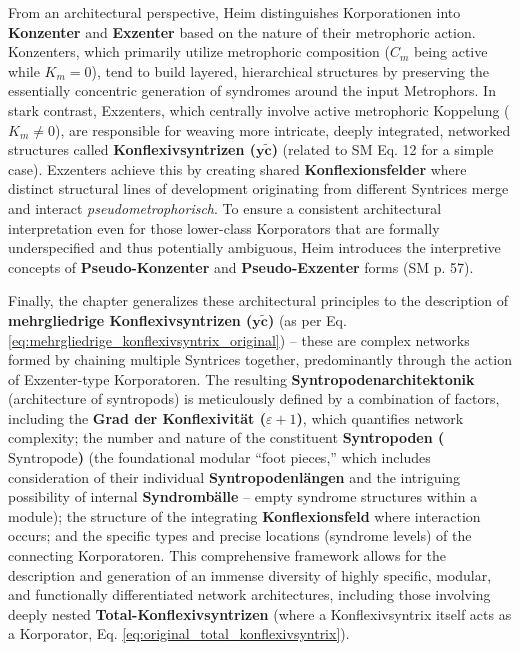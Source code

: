 \documentclass[12pt]{article}
\newcommand{\q}[1]{\enquote{#1}}
\newcommand{\konflexivsyntrix}{\bm{y\widetilde{c}}}
\newcommand{\syntropode}{\text{Syntropode}}
\begin{document}
From an architectural perspective, Heim distinguishes Korporationen into \textbf{Konzenter} and \textbf{Exzenter} based on the nature of their metrophoric action. Konzenters, which primarily utilize metrophoric composition (\( C_m \) being active while \( K_m=0 \)), tend to build layered, hierarchical structures by preserving the essentially concentric generation of syndromes around the input Metrophors. In stark contrast, Exzenters, which centrally involve active metrophoric Koppelung (\( K_m \neq 0 \)), are responsible for weaving more intricate, deeply integrated, networked structures called \textbf{Konflexivsyntrizen (\(\konflexivsyntrix\))} (related to SM Eq. 12 for a simple case). Exzenters achieve this by creating shared \textbf{Konflexionsfelder} where distinct structural lines of development originating from different Syntrices merge and interact \textit{pseudometrophorisch}. To ensure a consistent architectural interpretation even for those lower-class Korporators that are formally underspecified and thus potentially ambiguous, Heim introduces the interpretive concepts of \textbf{Pseudo-Konzenter} and \textbf{Pseudo-Exzenter} forms (SM p. 57).

Finally, the chapter generalizes these architectural principles to the description of \textbf{mehrgliedrige Konflexivsyntrizen (\(\konflexivsyntrix\))} (as per Eq. \eqref{eq:mehrgliedrige_konflexivsyntrix_original}) – these are complex networks formed by chaining multiple Syntrices together, predominantly through the action of Exzenter-type Korporatoren. The resulting \textbf{Syntropodenarchitektonik} (architecture of syntropods) is meticulously defined by a combination of factors, including the \textbf{Grad der Konflexivität (\( \varepsilon+1 \))}, which quantifies network complexity; the number and nature of the constituent \textbf{Syntropoden (\(\syntropode\))} (the foundational modular \q{foot pieces,} which includes consideration of their individual \textbf{Syntropodenlängen} and the intriguing possibility of internal \textbf{Syndrombälle} – empty syndrome structures within a module); the structure of the integrating \textbf{Konflexionsfeld} where interaction occurs; and the specific types and precise locations (syndrome levels) of the connecting Korporatoren. This comprehensive framework allows for the description and generation of an immense diversity of highly specific, modular, and functionally differentiated network architectures, including those involving deeply nested \textbf{Total-Konflexivsyntrizen} (where a Konflexivsyntrix itself acts as a Korporator, Eq. \eqref{eq:original_total_konflexivsyntrix}).
\end{document}
